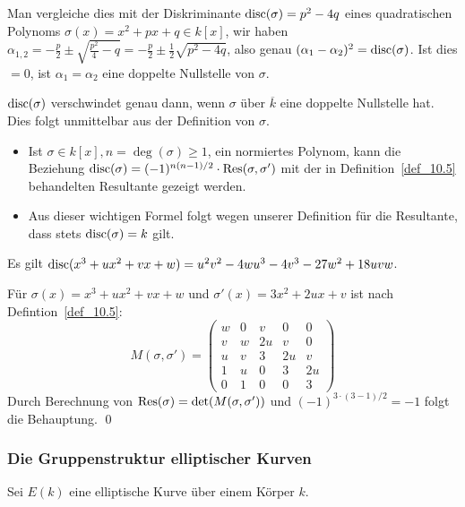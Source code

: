 \begin{bem}
	Man vergleiche dies mit der Diskriminante $\operatorname{disc}(\sigma) = p^2-4q$ eines quadratischen Polynoms $\sigma(x) = x^2+px+q \in k[x]$, wir haben $\alpha_{1,2} = -\frac{p}{2} \pm \sqrt{\frac{p^2}{4} - q} = -\frac{p}{2} \pm \frac{1}{2} \sqrt{p^2 -4q}$, also genau $(\alpha_1 - \alpha_2)^2 = \operatorname{disc}(\sigma)$. Ist dies $=0$, ist $\alpha_1 = \alpha_2$ eine doppelte Nullstelle von $\sigma$.
\end{bem}

\begin{bem}
\label{bem_12.14}
	$\operatorname{disc}(\sigma)$ verschwindet genau dann, wenn $\sigma$ über $\overline{k}$ eine doppelte Nullstelle hat. Dies folgt unmittelbar aus der Definition von $\sigma$.
\end{bem}

\begin{bem}
\label{bem_12.15}
	\begin{itemize}
		\item Ist $\sigma \in k[x], n = \deg(\sigma) \geq 1$, ein normiertes Polynom, kann die Beziehung $\operatorname{disc}(\sigma) = (-1)^{n(n-1)/2} \cdot \operatorname{Res}(\sigma, \sigma')$ mit der in Definition~\ref{def_10.5} behandelten Resultante gezeigt werden.
		\item Aus dieser wichtigen Formel folgt wegen unserer Definition für die Resultante, dass stets $\operatorname{disc}(\sigma) = k$ gilt.
	\end{itemize}
\end{bem}

\begin{kor}
\label{kor_12.16}
	Es gilt $\operatorname{disc}(x^3+ux^2+vx+w) = u^2v^2 - 4wu^3 - 4v^3 - 27w^2 + 18uvw$. 
\end{kor}

	Für $\sigma(x) = x^3 + ux^2 + vx + w$ und $\sigma'(x) = 3x^2+2ux+v$ ist nach Defintion~\ref{def_10.5}: 
	\[ M(\sigma,\sigma') = \begin{pmatrix}
	w & 0 & v & 0 & 0 \\ 
	v & w & 2u & v & 0 \\ 
	u & v & 3 & 2u & v \\ 
	1 & u & 0 & 3 & 2u \\ 
	0 & 1 & 0 & 0 & 3
	\end{pmatrix} \]
	Durch Berechnung von $\operatorname{Res}(\sigma) = \det(M(\sigma,\sigma'))$ und $(-1)^{3 \cdot (3-1)/2} = -1$ folgt die Behauptung. \qed
	
\nextlecture
\subsubsection{Die Gruppenstruktur elliptischer Kurven}
	Sei $E(k)$ eine elliptische Kurve über einem Körper $k$. \marginnote{[13]}
	
